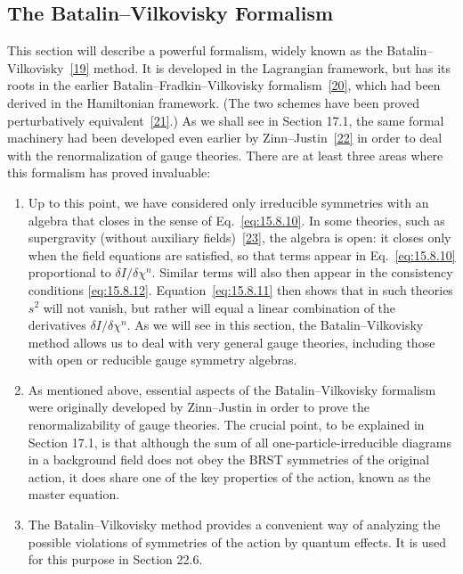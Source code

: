 \subsection[The Batalin--Vilkovisky Formalism]{The Batalin--Vilkovisky Formalism\footnotemark}
\label{sec:15.9}

This section will describe a powerful formalism, widely known as the
Batalin--Vilkovisky~\hyperref[ch15-ref-19]{[19]} method. It is developed in the
Lagrangian framework, but has its roots in the earlier
Batalin--Fradkin--Vilkovisky formalism~\hyperref[ch15-ref-20]{[20]}, which had
been derived in the Hamiltonian framework. (The two schemes have been proved
perturbatively equivalent~\hyperref[ch15-ref-21]{[21]}.) As we shall see in
Section 17.1, the same formal machinery had been developed even earlier by
Zinn--Justin~\hyperref[ch15-ref-22]{[22]} in order to deal with the
renormalization of gauge theories. There are at least three areas where this
formalism has proved invaluable:

\begin{enumerate}
\item[(i)] Up to this point, we have considered only irreducible symmetries
with an algebra that closes in the sense of Eq.~\eqref{eq:15.8.10}. In some
theories, such as supergravity (without auxiliary fields)~\hyperref[ch15-ref-23]{[23]},
the algebra is open: it closes only when the field equations are satisfied,
so that terms appear in Eq.~\eqref{eq:15.8.10} proportional to
$\delta I/\delta\chi^n$. Similar terms will also then appear in the
consistency conditions \eqref{eq:15.8.12}. Equation~\eqref{eq:15.8.11} then
shows that in such theories $s^2$ will not vanish, but rather will equal a
linear combination of the derivatives $\delta I/\delta\chi^n$. As we will see
in this section, the Batalin--Vilkovisky method allows us to deal with very
general gauge theories, including those with open or reducible gauge symmetry
algebras.

\item[(ii)] As mentioned above, essential aspects of the
Batalin--Vilkovisky formalism were originally developed by Zinn--Justin in
order to prove the renormalizability of gauge theories. The crucial point, to
be explained in Section 17.1, is that although the sum of all
one-particle-irreducible diagrams in a background field does not obey the BRST
symmetries of the original action, it does share one of the key properties of
the action, known as the master equation.

\item[(iii)] The Batalin--Vilkovisky method provides a convenient way of
analyzing the possible violations of symmetries of the action by quantum
effects. It is used for this purpose in Section 22.6.
\end{enumerate}

